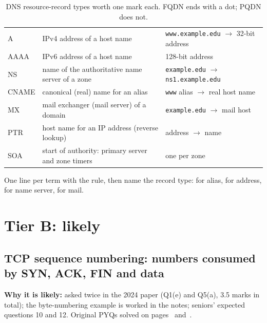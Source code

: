 \begin{table}[H]\centering\small\zebra
\begin{tabularx}{\linewidth}{L{17mm}YL{50mm}}\toprule
{} &  & \\\midrule
A & IPv4 address of a host name & \texttt{www.example.edu} $\to$ 32-bit address\\
AAAA & IPv6 address of a host name & 128-bit address\\
NS & name of the authoritative name server of a zone & \texttt{example.edu} $\to$ \texttt{ns1.example.edu}\\
CNAME & canonical (real) name for an alias & \texttt{www} alias $\to$ real host name\\
MX & mail exchanger (mail server) of a domain & \texttt{example.edu} $\to$ mail host\\
PTR & host name for an IP address (reverse lookup) & address $\to$ name\\
SOA & start of authority: primary server and zone timers & one per zone\\\bottomrule
\end{tabularx}
\caption{DNS resource-record types worth one mark each. FQDN ends with a dot; PQDN does not.}\end{table}

\begin{answerplan}[1 mark]
One line per term with the  rule, then name the record type:  for alias,  for address,  for name server,  for mail.
\end{answerplan}

\section{Tier B: likely}

\subsection{TCP sequence numbering: numbers consumed by SYN, ACK, FIN and data}\label{iq:C29}
    

\textbf{Why it is likely:} asked twice in the 2024 paper (Q1(e) and Q5(a), 3.5 marks in total); the byte-numbering example is worked in the notes; seniors' expected questions 10 and 12. Original PYQs solved on pages~\pageref{q:MS2024-1e} and~\pageref{q:MS2024-5a}.

